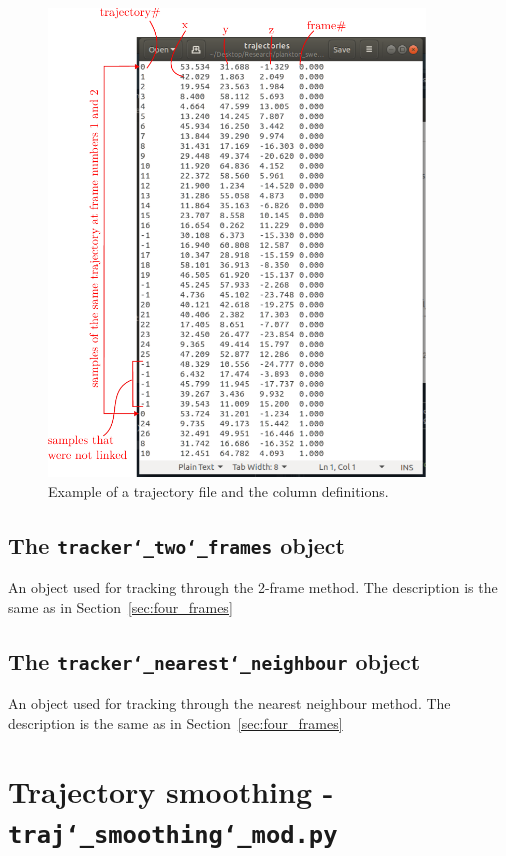 \documentclass[10pt,a4paper]{article}
\begin{document}
\begin{figure}
	\centering
	\includegraphics[width=10cm]{trajectory_files.pdf}
	\caption{Example of a trajectory file and the column definitions. \label{fig:trajfile}}
\end{figure}




\subsection{The \texttt{tracker\char`_two\char`_frames} object}

An object used for tracking through the 2-frame method. The description is the same as in Section~\ref{sec:four_frames}



\subsection{The \texttt{tracker\char`_nearest\char`_neighbour} object}

An object used for tracking through the nearest neighbour method. The description is the same as in Section~\ref{sec:four_frames}









\section{Trajectory smoothing - \texttt{traj\char`_smoothing\char`_mod.py}}
\end{document}
